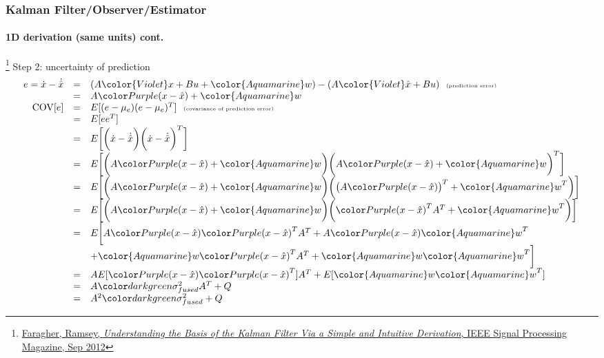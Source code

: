 \documentclass{beamer}
\begin{document}
\begin{frame}
\frametitle{Kalman Filter/Observer/Estimator}
\framesubtitle{1D derivation (same units) \tiny cont.}

\footnote{\tiny\hspace{-0.23in} \href{http://www.cl.cam.ac.uk/~rmf25/papers/Understanding the Basis of the Kalman Filter.pdf}{Faragher, Ramsey, \emph{Understanding the Basis of the Kalman Filter Via a Simple and Intuitive Derivation}, IEEE Signal Processing Magazine, Sep 2012}}
\scriptsize 
Step 2: {\color{red}uncertainty of prediction}
\begin{equation*}
\begin{array}{rlllll}
e=\dot{x} - \dot{\hat{x}}&=&  (A{\color{Violet}x}+B u+{\color{Aquamarine}w}) - (A{\color{Violet}\hat{x}}+B u) \ \ \textrm{\tiny (prediction error)}\\
&=& A\myaa+{\color{Aquamarine}w}\\
\mathrm{COV}[e] &=& E[(e-\mu_e)(e-\mu_e)^T]\ \ \textrm{\tiny (covariance of prediction error)}\\
&=& E[ee^T]\\
&=&E\bigg[\bigg(\dot{x} - \dot{\hat{x}}\bigg)\bigg(\dot{x} - \dot{\hat{x}}\bigg)^T\bigg]\\
&=&E\bigg[\bigg(  A\myaa+{\color{Aquamarine}w}\bigg)\bigg(  A\myaa+{\color{Aquamarine}w}\bigg)^T\bigg]\\
&=&E\bigg[\bigg(  A\myaa+{\color{Aquamarine}w}\bigg)\bigg(  \big(A\myaa\big)^T+{\color{Aquamarine}w}^T\bigg)\bigg]\\
&=&E\bigg[\bigg(  A\myaa+{\color{Aquamarine}w}\bigg)\bigg( \myaa^T A^T+{\color{Aquamarine}w}^T\bigg)\bigg]\\
&=&E\bigg[ A\myaa\myaa^T A^T +  A\myaa {\color{Aquamarine}w}^T \\
&&+ {\color{Aquamarine}w}\myaa^T A^T + {\color{Aquamarine}w}{\color{Aquamarine}w}^T\bigg]\\
&=& A E[\myaa\myaa^T] A^T + E[{\color{Aquamarine}w}{\color{Aquamarine}w}^T]\\
&=& A\varfused A^T +Q\\
&=& A^2\varfused +Q
\end{array}
\end{equation*}
\end{frame}
\end{document}
